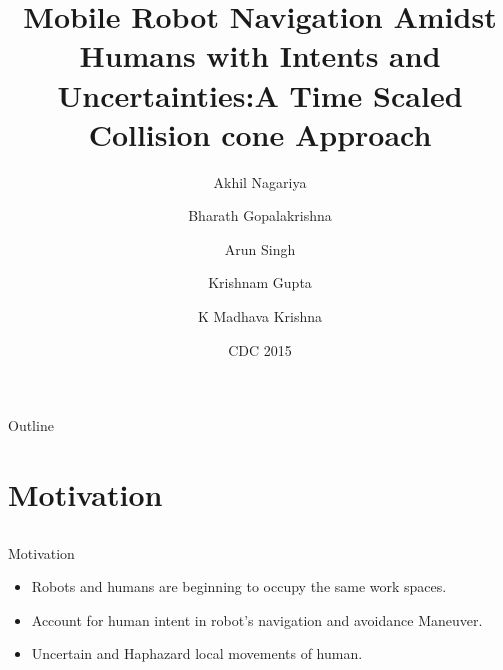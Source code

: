 \documentclass{beamer}
\title{Mobile Robot Navigation Amidst Humans with Intents and Uncertainties:A Time Scaled Collision cone Approach}
\subtitle{}
\author{Akhil Nagariya\inst{1} \and Bharath Gopalakrishna\inst{1} \and Arun Singh\inst{2} \and Krishnam Gupta \inst{1} \and K Madhava Krishna \inst{1}}
\institute[Universities of Somewhere and Elsewhere] %
{
  \inst{1}%
  RRC\\
  IIIT Hyderabad
  \and
  \inst{2}%
  Ben-Gurion University, Isreal
  }
\date{CDC 2015}
\begin{document}
\begin{frame}
  \titlepage
\end{frame}

\begin{frame}{Outline}
  \tableofcontents
\end{frame}

\section{Motivation}


\subsection{}

\begin{frame}{Motivation}
  \begin{itemize}
  \item {
   Robots and humans are beginning to occupy the same work spaces.
  }
  \item {
   Account for human intent in robot's navigation and avoidance Maneuver.
  }
  \item {
    Uncertain and Haphazard local movements of human.
  }
  \end{itemize}
\end{frame}



\end{document}
